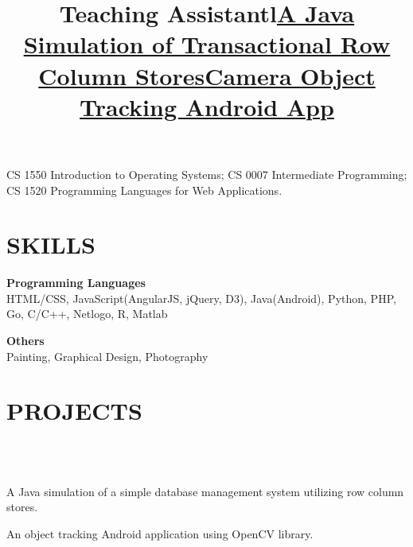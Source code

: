\begin{resume}
\title{\textbf{Teaching Assistant}}
\begin{position}
	CS 1550 Introduction to Operating Systems; CS 0007 Intermediate Programming; CS 1520 Programming Languages for Web Applications.
\end{position}



\section{\textsc{SKILLS}}

\textbf{Programming Languages}\\
HTML/CSS, JavaScript(AngularJS, jQuery, D3), 
Java(Android), Python, PHP, Go, C/C++, Netlogo, R, Matlab

\textbf{Others}\\
Painting, Graphical Design, Photography



\section{\textsc{PROJECTS}}
\begin{formatb}
  \title{l}\\
   \body\\
\end{formatb}

\title{\textbf{\href{https://github.com/adorazhang/AndroidOpenCVTracking}{A Java Simulation of Transactional Row Column Stores}}}
\begin{position}
	A Java simulation of a simple database management system utilizing row column stores.
\end{position}

\title{\textbf{\href{https://github.com/adorazhang/AndroidOpenCVTracking}{Camera Object Tracking Android App}}}
\begin{position}
An object tracking Android application using OpenCV library.
\end{position}


\end{resume}

